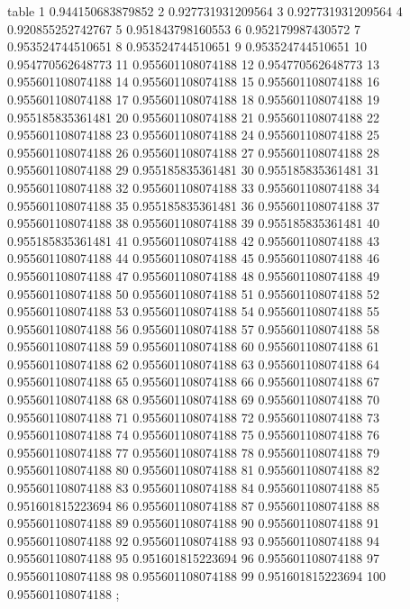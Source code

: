 table {%
	1 0.944150683879852
	2 0.927731931209564
	3 0.927731931209564
	4 0.920855252742767
	5 0.951843798160553
	6 0.952179987430572
	7 0.953524744510651
	8 0.953524744510651
	9 0.953524744510651
	10 0.954770562648773
	11 0.955601108074188
	12 0.954770562648773
	13 0.955601108074188
	14 0.955601108074188
	15 0.955601108074188
	16 0.955601108074188
	17 0.955601108074188
	18 0.955601108074188
	19 0.955185835361481
	20 0.955601108074188
	21 0.955601108074188
	22 0.955601108074188
	23 0.955601108074188
	24 0.955601108074188
	25 0.955601108074188
	26 0.955601108074188
	27 0.955601108074188
	28 0.955601108074188
	29 0.955185835361481
	30 0.955185835361481
	31 0.955601108074188
	32 0.955601108074188
	33 0.955601108074188
	34 0.955601108074188
	35 0.955185835361481
	36 0.955601108074188
	37 0.955601108074188
	38 0.955601108074188
	39 0.955185835361481
	40 0.955185835361481
	41 0.955601108074188
	42 0.955601108074188
	43 0.955601108074188
	44 0.955601108074188
	45 0.955601108074188
	46 0.955601108074188
	47 0.955601108074188
	48 0.955601108074188
	49 0.955601108074188
	50 0.955601108074188
	51 0.955601108074188
	52 0.955601108074188
	53 0.955601108074188
	54 0.955601108074188
	55 0.955601108074188
	56 0.955601108074188
	57 0.955601108074188
	58 0.955601108074188
	59 0.955601108074188
	60 0.955601108074188
	61 0.955601108074188
	62 0.955601108074188
	63 0.955601108074188
	64 0.955601108074188
	65 0.955601108074188
	66 0.955601108074188
	67 0.955601108074188
	68 0.955601108074188
	69 0.955601108074188
	70 0.955601108074188
	71 0.955601108074188
	72 0.955601108074188
	73 0.955601108074188
	74 0.955601108074188
	75 0.955601108074188
	76 0.955601108074188
	77 0.955601108074188
	78 0.955601108074188
	79 0.955601108074188
	80 0.955601108074188
	81 0.955601108074188
	82 0.955601108074188
	83 0.955601108074188
	84 0.955601108074188
	85 0.951601815223694
	86 0.955601108074188
	87 0.955601108074188
	88 0.955601108074188
	89 0.955601108074188
	90 0.955601108074188
	91 0.955601108074188
	92 0.955601108074188
	93 0.955601108074188
	94 0.955601108074188
	95 0.951601815223694
	96 0.955601108074188
	97 0.955601108074188
	98 0.955601108074188
	99 0.951601815223694
	100 0.955601108074188
};
